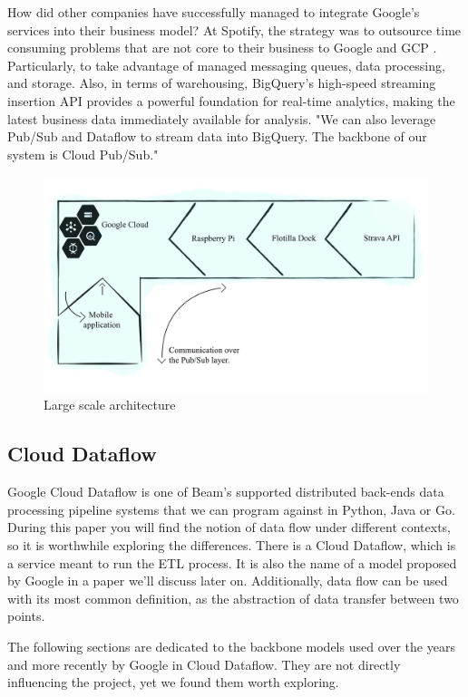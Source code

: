 How did other companies have successfully managed to integrate Google's services into their business model? At Spotify, the strategy was to outsource time consuming problems that are not core to their business to Google and GCP \cite{SpotifyLabs1}. Particularly, to take advantage of managed messaging queues, data processing, and storage. Also, in terms of warehousing, BigQuery's high-speed streaming insertion API provides a powerful foundation for real-time analytics, making the latest business data immediately available for analysis. "We can also leverage Pub/Sub and Dataflow to stream data into BigQuery. The backbone of our system is Cloud Pub/Sub." \cite{SpotifyLabs2} 

\begin{figure}[htp]
    \centering
    \includegraphics[width = 12cm]{figures/architecture_large_scale}
    \caption{Large scale architecture}
    \label{fig:lsa}
\end{figure}

\subsection{Cloud Dataflow}

Google Cloud Dataflow is one of Beam's supported distributed back-ends data processing pipeline systems that we can program against in Python, Java or Go. During this paper you will find the notion of data flow under different contexts, so it is worthwhile exploring the differences. There is a Cloud Dataflow, which is a service meant to run the ETL process. It is also the name of a model proposed by Google in a paper we'll discuss later on. Additionally, data flow can be used with its most common definition, as the abstraction of data transfer between two points.

The following sections are dedicated to the backbone models used over the years and more recently by Google in Cloud Dataflow. They are not directly influencing the project, yet we found them worth exploring.


